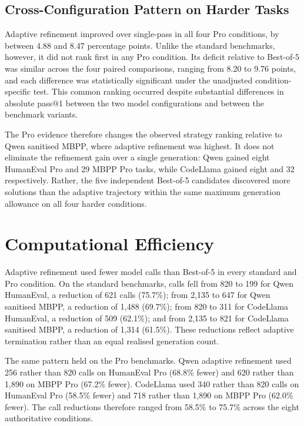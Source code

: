 \subsection{Cross-Configuration Pattern on Harder Tasks}

Adaptive refinement improved over single-pass in all four Pro conditions, by between 4.88 and 8.47 percentage points. Unlike the standard benchmarks, however, it did not rank first in any Pro condition. Its deficit relative to Best-of-5 was similar across the four paired comparisons, ranging from 8.20 to 9.76 points, and each difference was statistically significant under the unadjusted condition-specific test. This common ranking occurred despite substantial differences in absolute pass@1 between the two model configurations and between the benchmark variants.

The Pro evidence therefore changes the observed strategy ranking relative to Qwen sanitised MBPP, where adaptive refinement was highest. It does not eliminate the refinement gain over a single generation: Qwen gained eight HumanEval Pro and 29 MBPP Pro tasks, while CodeLlama gained eight and 32 respectively. Rather, the five independent Best-of-5 candidates discovered more solutions than the adaptive trajectory within the same maximum generation allowance on all four harder conditions.

\section{Computational Efficiency}

Adaptive refinement used fewer model calls than Best-of-5 in every standard and Pro condition. On the standard benchmarks, calls fell from 820 to 199 for Qwen HumanEval, a reduction of 621 calls (75.7\%); from 2,135 to 647 for Qwen sanitised MBPP, a reduction of 1,488 (69.7\%); from 820 to 311 for CodeLlama HumanEval, a reduction of 509 (62.1\%); and from 2,135 to 821 for CodeLlama sanitised MBPP, a reduction of 1,314 (61.5\%). These reductions reflect adaptive termination rather than an equal realised generation count.

The same pattern held on the Pro benchmarks. Qwen adaptive refinement used 256 rather than 820 calls on HumanEval Pro (68.8\% fewer) and 620 rather than 1,890 on MBPP Pro (67.2\% fewer). CodeLlama used 340 rather than 820 calls on HumanEval Pro (58.5\% fewer) and 718 rather than 1,890 on MBPP Pro (62.0\% fewer). The call reductions therefore ranged from 58.5\% to 75.7\% across the eight authoritative conditions.


